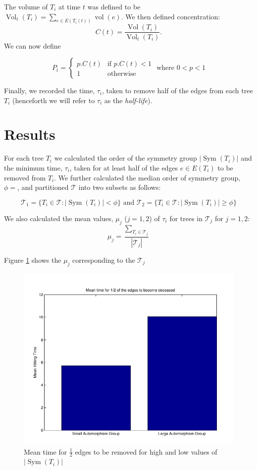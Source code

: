 \documentclass[10pt]{amsart} %
\theoremstyle{definition}
\DeclareMathOperator{\vol}{vol}
\DeclareMathOperator{\Vol}{Vol}
\DeclareMathOperator{\Sym}{Sym}
\begin{document}
The volume of $T_i$ at time $t$ was defined to be $\Vol_{t}(T_i) = \sum_{e \in E(T_i(t))} \vol(e)$.  We then defined concentration: 
\[C(t) = \frac{\Vol(T_i)}{\Vol_{t}(T_i)}.\]
We can now define %

\[P_t = \begin{cases} p.C(t) &\mbox{if } p.C(t) <1 \\
1 & \mbox{otherwise }  \end{cases} \text{       where   } 0<p<1 \]

Finally, we recorded the time, $\tau_{i}$, taken to remove half of the edges from each tree $T_{i}$ (henceforth we will refer to $\tau_i$ as the \emph{half-life}). 
 
\section{Results}  

For each tree $T_i$ we calculated the order of the symmetry group $\lvert\Sym(T_i)\rvert$ and the minimum time, $\tau_i$, taken for at least half of the edges $e \in E(T_i)$  to be removed from $T_i$.  We further calculated the median order of symmetry group, $\phi = $, and partitioned $\mathcal{T}$ into two subsets as follows: 

\[\mathcal{T}_{1} = \{T_i \in \mathcal{T} : \lvert\Sym(T_i)\rvert < \phi\} \text{      and      }\mathcal{T}_{2} = \{T_i \in \mathcal{T} : \lvert\Sym(T_i)\rvert \geq \phi\} \]
 
We also calculated the mean values, $\mu_j$ ($j = 1,2$) of $\tau_i$ for trees in $\mathcal{T}_j$ for $j = 1,2$:
\[\mu_j = \frac{\sum_{T_i \in \mathcal{T}_j}}{|\mathcal{T}_j|}\]

Figure \ref{t12} shows the $\mu_j$ corresponding to the $\mathcal{T}_j$

\begin{figure}[H]

              \centering
              \includegraphics[scale=0.5]{half.jpeg}
                \caption{Mean time for $\frac{1}{2}$ edges to be removed for high and low values of $|\Sym(T_i)|$}\label{t12}
\end{figure}
\end{document}
